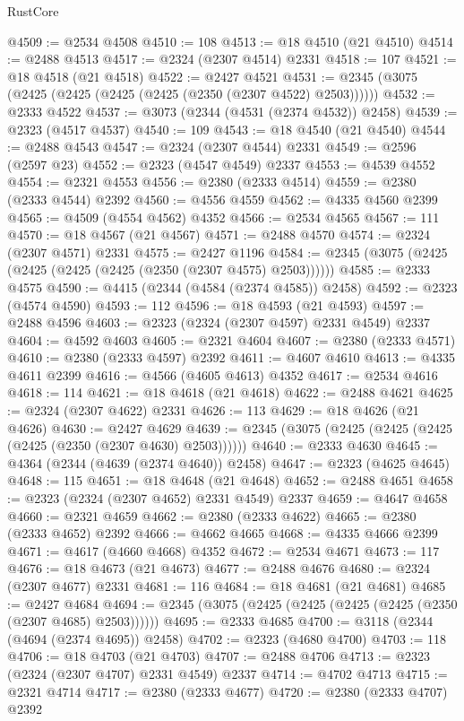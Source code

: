 \begin{lexlean}{RustCore}
\begin{coremodule}
@4509 := @2534 @4508
@4510 := 108
@4513 := @18 @4510 (@21 @4510)
@4514 := @2488 @4513
@4517 := @2324 (@2307 @4514) @2331
@4518 := 107
@4521 := @18 @4518 (@21 @4518)
@4522 := @2427 @4521
@4531 := @2345 (@3075 (@2425 (@2425 (@2425 (@2425 (@2350 (@2307 @4522) @2503))))))
@4532 := @2333 @4522
@4537 := @3073 (@2344 (@4531 (@2374 @4532)) @2458)
@4539 := @2323 (@4517 @4537)
@4540 := 109
@4543 := @18 @4540 (@21 @4540)
@4544 := @2488 @4543
@4547 := @2324 (@2307 @4544) @2331
@4549 := @2596 (@2597 @23)
@4552 := @2323 (@4547 @4549) @2337
@4553 := @4539 @4552
@4554 := @2321 @4553
@4556 := @2380 (@2333 @4514)
@4559 := @2380 (@2333 @4544) @2392
@4560 := @4556 @4559
@4562 := @4335 @4560 @2399
@4565 := @4509 (@4554 @4562) @4352
@4566 := @2534 @4565
@4567 := 111
@4570 := @18 @4567 (@21 @4567)
@4571 := @2488 @4570
@4574 := @2324 (@2307 @4571) @2331
@4575 := @2427 @1196
@4584 := @2345 (@3075 (@2425 (@2425 (@2425 (@2425 (@2350 (@2307 @4575) @2503))))))
@4585 := @2333 @4575
@4590 := @4415 (@2344 (@4584 (@2374 @4585)) @2458)
@4592 := @2323 (@4574 @4590)
@4593 := 112
@4596 := @18 @4593 (@21 @4593)
@4597 := @2488 @4596
@4603 := @2323 (@2324 (@2307 @4597) @2331 @4549) @2337
@4604 := @4592 @4603
@4605 := @2321 @4604
@4607 := @2380 (@2333 @4571)
@4610 := @2380 (@2333 @4597) @2392
@4611 := @4607 @4610
@4613 := @4335 @4611 @2399
@4616 := @4566 (@4605 @4613) @4352
@4617 := @2534 @4616
@4618 := 114
@4621 := @18 @4618 (@21 @4618)
@4622 := @2488 @4621
@4625 := @2324 (@2307 @4622) @2331
@4626 := 113
@4629 := @18 @4626 (@21 @4626)
@4630 := @2427 @4629
@4639 := @2345 (@3075 (@2425 (@2425 (@2425 (@2425 (@2350 (@2307 @4630) @2503))))))
@4640 := @2333 @4630
@4645 := @4364 (@2344 (@4639 (@2374 @4640)) @2458)
@4647 := @2323 (@4625 @4645)
@4648 := 115
@4651 := @18 @4648 (@21 @4648)
@4652 := @2488 @4651
@4658 := @2323 (@2324 (@2307 @4652) @2331 @4549) @2337
@4659 := @4647 @4658
@4660 := @2321 @4659
@4662 := @2380 (@2333 @4622)
@4665 := @2380 (@2333 @4652) @2392
@4666 := @4662 @4665
@4668 := @4335 @4666 @2399
@4671 := @4617 (@4660 @4668) @4352
@4672 := @2534 @4671
@4673 := 117
@4676 := @18 @4673 (@21 @4673)
@4677 := @2488 @4676
@4680 := @2324 (@2307 @4677) @2331
@4681 := 116
@4684 := @18 @4681 (@21 @4681)
@4685 := @2427 @4684
@4694 := @2345 (@3075 (@2425 (@2425 (@2425 (@2425 (@2350 (@2307 @4685) @2503))))))
@4695 := @2333 @4685
@4700 := @3118 (@2344 (@4694 (@2374 @4695)) @2458)
@4702 := @2323 (@4680 @4700)
@4703 := 118
@4706 := @18 @4703 (@21 @4703)
@4707 := @2488 @4706
@4713 := @2323 (@2324 (@2307 @4707) @2331 @4549) @2337
@4714 := @4702 @4713
@4715 := @2321 @4714
@4717 := @2380 (@2333 @4677)
@4720 := @2380 (@2333 @4707) @2392

\end{coremodule}
\end{lexlean}
